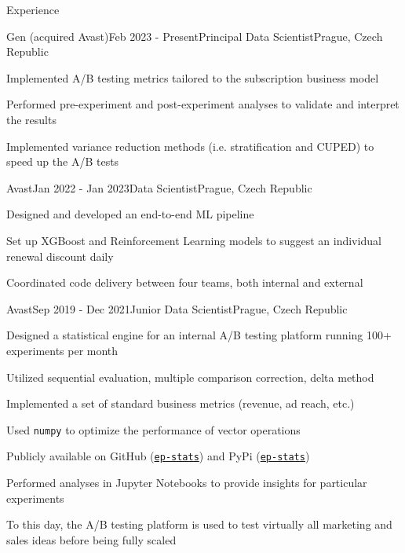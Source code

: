 \documentclass[
	11pt, %
]{resume} %
\begin{document}

\begin{rSection}{Experience}
	
	\begin{rSubsection}{Gen (acquired Avast)}{Feb 2023 - Present}{Principal Data Scientist}{Prague, Czech Republic}
        \item Implemented A/B testing metrics tailored to the subscription business model
        \item Performed pre-experiment and post-experiment analyses to validate and interpret the results
        \item Implemented variance reduction methods (i.e. stratification and CUPED) to speed up the A/B tests
	\end{rSubsection}
	
	
	\begin{rSubsection}{Avast}{Jan 2022 - Jan 2023}{Data Scientist}{Prague, Czech Republic}
		\item Designed and developed an end-to-end ML pipeline
		\item Set up XGBoost and Reinforcement Learning models to suggest an individual renewal discount daily
		\item Coordinated code delivery between four teams, both internal and external
	\end{rSubsection}
	
	
	\begin{rSubsection}{Avast}{Sep 2019 - Dec 2021}{Junior Data Scientist}{Prague, Czech Republic}
        \item Designed a statistical engine for an internal A/B testing platform running 100+ experiments per month
		\begin{rItemize}
			\item Utilized sequential evaluation, multiple comparison correction, delta method
			\item Implemented a set of standard business metrics (revenue, ad reach, etc.)
			\item Used \texttt{numpy} to optimize the performance of vector operations
			\item Publicly available on GitHub (\href{https://github.com/avast/ep-stats}{\texttt{ep-stats}}) and PyPi (\href{https://pypi.org/project/ep-stats/}{\texttt{ep-stats}})
		\end{rItemize}
		\item Performed analyses in Jupyter Notebooks to provide insights for particular experiments
		\item To this day, the A/B testing platform is used to test virtually all marketing and sales ideas before being fully scaled
	\end{rSubsection}
	

\end{rSection}
\end{document}

